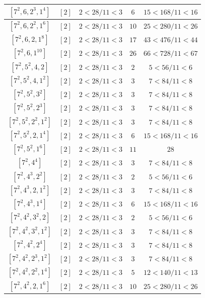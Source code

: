 \documentclass{article}%
\begin{document}
\begin{center}
\begin{longtable}{||c|c|c|c|c||}
$[7^{2}, 6, 2^{3}, 1^{4}]$ & $[2]$ & $2 < 28/11 < 3$ & $6$ & $15 < 168/11 < 16$ \\ \hline 
$[7^{2}, 6, 2^{2}, 1^{6}]$ & $[2]$ & $2 < 28/11 < 3$ & $10$ & $25 < 280/11 < 26$ \\ \hline 
$[7^{2}, 6, 2, 1^{8}]$ & $[2]$ & $2 < 28/11 < 3$ & $17$ & $43 < 476/11 < 44$ \\ \hline 
$[7^{2}, 6, 1^{10}]$ & $[2]$ & $2 < 28/11 < 3$ & $26$ & $66 < 728/11 < 67$ \\ \hline 
$[7^{2}, 5^{2}, 4, 2]$ & $[2]$ & $2 < 28/11 < 3$ & $2$ & $5 < 56/11 < 6$ \\ \hline 
$[7^{2}, 5^{2}, 4, 1^{2}]$ & $[2]$ & $2 < 28/11 < 3$ & $3$ & $7 < 84/11 < 8$ \\ \hline 
$[7^{2}, 5^{2}, 3^{2}]$ & $[2]$ & $2 < 28/11 < 3$ & $3$ & $7 < 84/11 < 8$ \\ \hline 
$[7^{2}, 5^{2}, 2^{3}]$ & $[2]$ & $2 < 28/11 < 3$ & $3$ & $7 < 84/11 < 8$ \\ \hline 
$[7^{2}, 5^{2}, 2^{2}, 1^{2}]$ & $[2]$ & $2 < 28/11 < 3$ & $3$ & $7 < 84/11 < 8$ \\ \hline 
$[7^{2}, 5^{2}, 2, 1^{4}]$ & $[2]$ & $2 < 28/11 < 3$ & $6$ & $15 < 168/11 < 16$ \\ \hline 
$[7^{2}, 5^{2}, 1^{6}]$ & $[2]$ & $2 < 28/11 < 3$ & $11$ & $28$ \\ \hline 
$[7^{2}, 4^{4}]$ & $[2]$ & $2 < 28/11 < 3$ & $3$ & $7 < 84/11 < 8$ \\ \hline 
$[7^{2}, 4^{3}, 2^{2}]$ & $[2]$ & $2 < 28/11 < 3$ & $2$ & $5 < 56/11 < 6$ \\ \hline 
$[7^{2}, 4^{3}, 2, 1^{2}]$ & $[2]$ & $2 < 28/11 < 3$ & $3$ & $7 < 84/11 < 8$ \\ \hline 
$[7^{2}, 4^{3}, 1^{4}]$ & $[2]$ & $2 < 28/11 < 3$ & $6$ & $15 < 168/11 < 16$ \\ \hline 
$[7^{2}, 4^{2}, 3^{2}, 2]$ & $[2]$ & $2 < 28/11 < 3$ & $2$ & $5 < 56/11 < 6$ \\ \hline 
$[7^{2}, 4^{2}, 3^{2}, 1^{2}]$ & $[2]$ & $2 < 28/11 < 3$ & $3$ & $7 < 84/11 < 8$ \\ \hline 
$[7^{2}, 4^{2}, 2^{4}]$ & $[2]$ & $2 < 28/11 < 3$ & $3$ & $7 < 84/11 < 8$ \\ \hline 
$[7^{2}, 4^{2}, 2^{3}, 1^{2}]$ & $[2]$ & $2 < 28/11 < 3$ & $3$ & $7 < 84/11 < 8$ \\ \hline 
$[7^{2}, 4^{2}, 2^{2}, 1^{4}]$ & $[2]$ & $2 < 28/11 < 3$ & $5$ & $12 < 140/11 < 13$ \\ \hline 
$[7^{2}, 4^{2}, 2, 1^{6}]$ & $[2]$ & $2 < 28/11 < 3$ & $10$ & $25 < 280/11 < 26$ \\ \hline 

\end{longtable}
\end{center}
\end{document}
